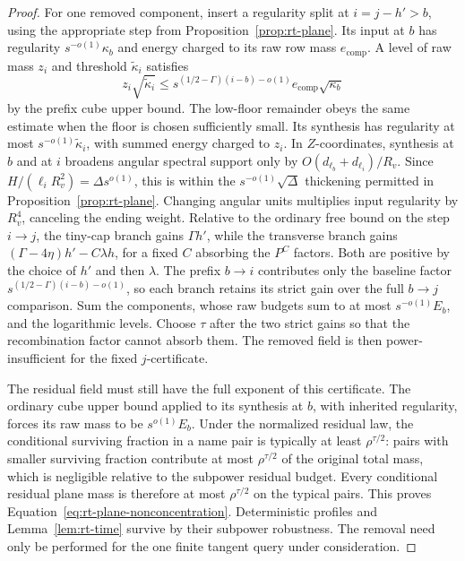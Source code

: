 \begin{proof}
For one removed component, insert a regularity split at
$i=j-h'>b$, using the appropriate step from
Proposition~\ref{prop:rt-plane}.  Its input at $b$ has regularity
$s^{-o(1)}\kappa_b$ and energy charged to its raw row mass
$e_{\mathrm{comp}}$.  A level of raw mass $z_i$ and threshold
$\widetilde\kappa_i$ satisfies
\[
 z_i\sqrt{\widetilde\kappa_i}
 \le s^{(1/2-\Gamma)(i-b)-o(1)}
                         e_{\mathrm{comp}}\sqrt{\kappa_b}
\]
by the prefix cube upper bound.  The low-floor remainder obeys the
same estimate when the floor is chosen sufficiently small.
Its synthesis has regularity at most
$s^{-o(1)}\widetilde\kappa_i$, with summed energy charged to
$z_i$.
In $Z$-coordinates, synthesis at $b$ and at $i$ broadens angular
spectral support only by $O(d_{\ell_b}+d_{\ell_i})/R_v$.
Since $H/(\ell_iR_v^2)=\Delta s^{o(1)}$, this is within the
$s^{-o(1)}\sqrt\Delta$ thickening permitted in
Proposition~\ref{prop:rt-plane}.  Changing angular units multiplies
input regularity by $R_v^4$, canceling the ending weight.
Relative to the ordinary free bound on the step $i\to j$, the tiny-cap
branch gains $\Gamma h'$, while the transverse branch gains
$(\Gamma-4\eta)h'-C\lambda h$, for a fixed $C$ absorbing the
$P^C$ factors. Both are positive by the choice of $h'$ and then
$\lambda$. The prefix $b\to i$ contributes only the baseline factor
$s^{(1/2-\Gamma)(i-b)-o(1)}$, so each branch retains its strict gain
over the full $b\to j$ comparison.
Sum the components, whose raw budgets sum to at most
$s^{-o(1)}E_b$, and the logarithmic levels.  Choose $\tau$ after
the two strict gains so that the recombination factor cannot absorb
them.  The removed field is then power-insufficient for the fixed
$j$-certificate.

The residual field must still have the full exponent of this
certificate.  The ordinary cube upper bound applied to its
synthesis at $b$, with inherited regularity, forces its raw mass
to be $s^{o(1)}E_b$.  Under the normalized residual law, the
conditional surviving fraction in a name pair is typically at
least $\rho^{\tau/2}$: pairs with smaller surviving fraction
contribute at most $\rho^{\tau/2}$ of the original total mass,
which is negligible relative to the subpower residual budget.
Every conditional residual plane mass is therefore at most
$\rho^{\tau/2}$ on the typical pairs.  This proves
Equation~\eqref{eq:rt-plane-nonconcentration}.  Deterministic
profiles and Lemma~\ref{lem:rt-time} survive by their subpower
robustness.  The removal need only be performed for the one finite
tangent query under consideration.
\end{proof}

